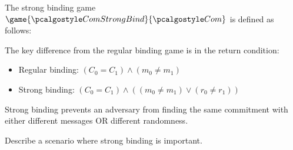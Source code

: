 \ifsolutions
\begin{mysolution}
  The strong binding game $\game{\algo{ComStrongBind}}{\algo{Com}}$ is defined as follows:
  
  \begin{center}
    \begin{tcolorbox}[width=8cm]
      \begin{pchstack}[center]
      \end{pchstack}
    \end{tcolorbox}
  \end{center}
  
  The key difference from the regular binding game is in the return condition:
  \begin{itemize}
    \item Regular binding: $(C_0 = C_1) \wedge (m_0 \neq m_1)$
    \item Strong binding: $(C_0 = C_1) \wedge ((m_0 \neq m_1) \vee (r_0 \neq r_1))$
  \end{itemize}
  
  Strong binding prevents an adversary from finding the same commitment with either different messages OR different randomness.
\end{mysolution}
\fi

\begin{exercise}[Optional]
  Describe a scenario where strong binding is important.
\end{exercise}

